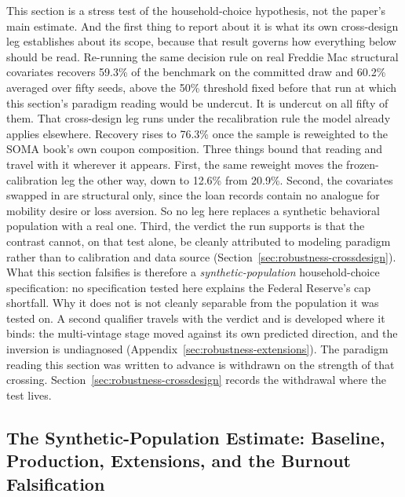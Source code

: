 \documentclass[12pt]{article}
\begin{document}
This section is a stress test of the household-choice hypothesis, not the paper's main estimate. And the first thing to report about it is what its own cross-design leg establishes about its scope, because that result governs how everything below should be read. Re-running the same decision rule on real Freddie Mac structural covariates recovers 59.3\% of the benchmark on the committed draw and 60.2\% averaged over fifty seeds, above the 50\% threshold fixed before that run at which this section's paradigm reading would be undercut. It is undercut on all fifty of them. That cross-design leg runs under the recalibration rule the model already applies elsewhere. Recovery rises to 76.3\% once the sample is reweighted to the SOMA book's own coupon composition. Three things bound that reading and travel with it wherever it appears. First, the same reweight moves the frozen-calibration leg the other way, down to 12.6\% from 20.9\%. Second, the covariates swapped in are structural only, since the loan records contain no analogue for mobility desire or loss aversion. So no leg here replaces a synthetic behavioral population with a real one. Third, the verdict the run supports is that the contrast cannot, on that test alone, be cleanly attributed to modeling paradigm rather than to calibration and data source (Section~\ref{sec:robustness-crossdesign}). What this section falsifies is therefore a \emph{synthetic-population} household-choice specification: no specification tested here explains the Federal Reserve's cap shortfall. Why it does not is not cleanly separable from the population it was tested on. A second qualifier travels with the verdict and is developed where it binds: the multi-vintage stage moved against its own predicted direction, and the inversion is undiagnosed (Appendix~\ref{sec:robustness-extensions}). The paradigm reading this section was written to advance is withdrawn on the strength of that crossing. Section~\ref{sec:robustness-crossdesign} records the withdrawal where the test lives.

\subsection{The Synthetic-Population Estimate: Baseline, Production, Extensions, and the Burnout Falsification}\label{sec:abm-results}
\end{document}
